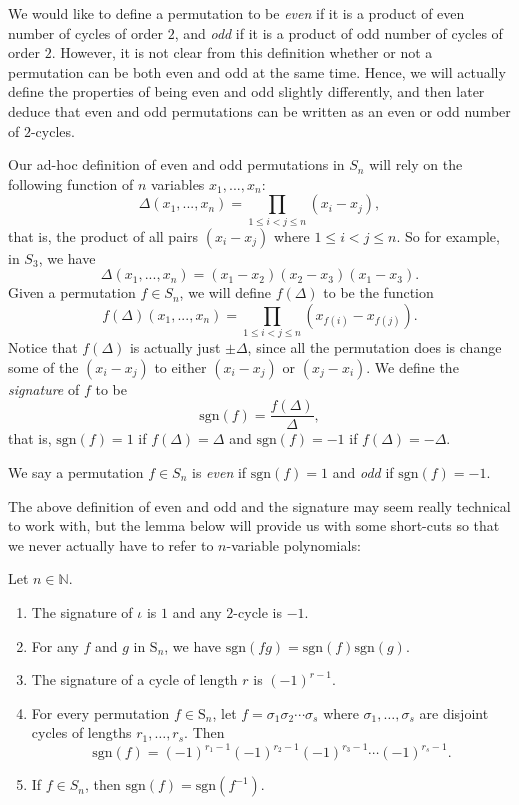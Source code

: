 \documentclass[11pt,dvipsnames]{book}
\numberwithin{figure}{section} %
\numberwithin{table}{section} %
\begin{document}
We would like to define a permutation to be {\it even} if it is
a product of even number of cycles of order $2$, and {\it odd} if it is a
product of odd number of cycles of order $2$. However, it is not clear from this definition whether or not a permutation can be both even and odd at the same time. Hence, we will actually define the properties of being even and odd slightly differently, and then later deduce that even and odd permutations can be written as an even or odd number of $2$-cycles.

Our ad-hoc definition of even and odd permutations in $S_{n}$ will rely on the following function of $n$ variables $x_{1},...,x_{n}$:
\[\Delta (x_{1},...,x_{n}) = \prod_{1\leq i<j\leq n} (x_{i}-x_{j}),\]
that is, the product of all pairs $(x_{i}-x_{j})$ where $1\leq i<j\leq n$. So for example, in $S_{3}$, we have 
\[\Delta (x_{1},...,x_{n}) = (x_{1}-x_{2})(x_{2}-x_{3})(x_{1}-x_{3}).\]
Given a permutation $f\in S_{n}$, we will define $f(\Delta)$ to be the function 
\[f(\Delta)(x_{1},...,x_{n})  = \prod_{1\leq i<j\leq n} (x_{f(i)}-x_{f(j)}).\]
Notice that $f(\Delta)$ is actually just $\pm \Delta$, since all the permutation does is change some of the $(x_{i}-x_{j})$ to either $(x_{i}-x_{j})$ or $(x_{j}-x_{i})$. We define the {\it signature} of $f$ to be
\[
\mbox{sgn}(f) = \frac{f(\Delta)}{\Delta},
\]
that is, $\mbox{sgn}(f) =1$ if $f(\Delta)=\Delta$ and $\mbox{sgn}(f) =-1$ if $f(\Delta)=-\Delta$. 

\begin{definition}
We say a permutation $f\in S_{n}$ is {\it even} if $\mbox{sgn}(f) =1$ and {\it odd} if  $\mbox{sgn}(f) =-1$.
\end{definition}

The above definition of even and odd and the signature may seem really technical to work with, but the lemma below will provide us with some short-cuts so that we never actually have to refer to $n$-variable polynomials:


\begin{lemma}%
Let $n\in\mathbb{N}$.
\begin{enumerate}[label=(\alph*)]
\item The signature of $\iota$ is $1$ and any $2$-cycle is $-1$. 
\item For any $f$ and $g$ in $\mathrm{S}_n$,  we have
$\mathrm{sgn}(fg)=\mathrm{sgn}(f)\mathrm{sgn}(g)$.
\item The signature of a cycle of length $r$ is $(-1)^{r-1}$.%
\item For every permutation $f\in\mathrm{S}_n$,  let $f=\sigma_{1}\sigma_{2}\cdots\sigma_{s}$
 where $\sigma_{1},\ldots,\sigma_{s}$ are disjoint cycles of
lengths $r_{1},\ldots,r_{s}$.  Then
$$
\mathrm{sgn}(f)=(-1)^{r_1-1}(-1)^{r_2-1}(-1)^{r_3-1}\cdots (-1)^{r_s-1}.%
$$

\item If $f\in S_{n}$, then $\mathrm{sgn}(f)=\mathrm{sgn}(f^{-1})$. 

\end{enumerate}
\end{lemma}
\end{document}
